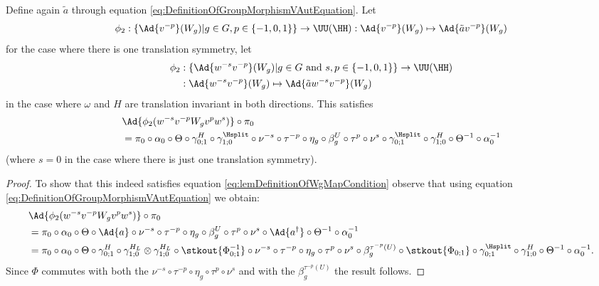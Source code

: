 \begin{lemma}\label{lem:DefinitionOfWgMap}
	Define again $\tilde{a}$ through equation \eqref{eq:DefinitionOfGroupMorphismVAutEquation}. Let
	\begin{equation}
		\phi_2:\{\Ad{v^{-p}}(W_g)|g\in G,p\in\{-1,0,1\}\}\rightarrow \UU(\HH):\Ad{v^{-p}} (W_g)\mapsto \Ad{\tilde{a}v^{-p}} (W_g)
	\end{equation}
	for the case where there is one translation symmetry, let
	\begin{align}
		\phi_2&:\{\Ad{w^{-s}v^{-p}}(W_g)|g\in G\text{ and }s,p\in\{-1,0,1\}\}\rightarrow \UU(\HH)\\
		\nonumber
		&:\Ad{w^{-s}v^{-p}} (W_g)\mapsto \Ad{\tilde{a}w^{-s}v^{-p}} (W_g)
	\end{align}
	in the case where $\omega$ and $H$ are translation invariant in both directions. This satisfies
	\begin{align}\label{eq:lemDefinitionOfWgMapCondition}
		&\Ad{\phi_2(w^{-s}v^{-p}W_g v^{p}w^{s})}\circ\pi_0\\
		\nonumber
		&=\pi_0\circ \alpha_0\circ\Theta\circ\gamma^{H}_{0;1}\circ\gamma^{\Hsplit}_{1;0}\circ\nu^{-s}\circ\tau^{-p}\circ\eta_g\circ\beta_g^U\circ\tau^p\circ\nu^{s}\circ\gamma^{\Hsplit}_{0;1}\circ\gamma^{H}_{1;0}\circ\Theta^{-1}\circ\alpha_0^{-1}
	\end{align}
	(where $s=0$ in the case where there is just one translation symmetry).
\end{lemma}
\begin{proof}
	To show that this indeed satisfies equation \eqref{eq:lemDefinitionOfWgMapCondition} observe that using equation \eqref{eq:DefinitionOfGroupMorphismVAutEquation} we obtain:
	\begin{align}
		\nonumber
		&\Ad{\phi_2(w^{-s}v^{-p}W_g v^{p}w^{s})}\circ\pi_0\\
		&=\pi_0\circ \alpha_0\circ\Theta\circ\Ad{a}\circ\nu^{-s}\circ\tau^{-p}\circ\eta_g\circ\beta_g^U\circ\tau^p\circ\nu^{s}\circ\Ad{a^{\dagger}}\circ\Theta^{-1}\circ\alpha_0^{-1}\\
		\nonumber
		&=\pi_0\circ \alpha_0\circ\Theta\circ\gamma^H_{0;1}\circ\gamma^{H_L}_{1;0}\otimes\gamma^{H_L}_{1;0}\circ\stkout{\Phi_{0;1}^{-1}}\circ\nu^{-s}\circ\tau^{-p}\circ\eta_g\circ\tau^p\circ\nu^{s}\circ\beta_g^{\tau^{-p}(U)}\circ\stkout{\Phi_{0;1}}\circ\gamma^{\Hsplit}_{0;1}\circ\gamma^H_{1;0}\circ\Theta^{-1}\circ\alpha_0^{-1}.
	\end{align}
	Since $\Phi$ commutes with both the $\nu^{-s}\circ\tau^{-p}\circ\eta_g\circ\tau^p\circ\nu^s$ and with the $\beta_g^{\tau^{-p}(U)}$ the result follows.
\end{proof}
